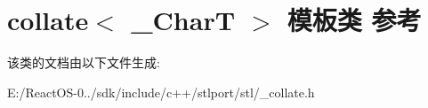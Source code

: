 \hypertarget{classcollate}{}\section{collate$<$ \+\_\+\+CharT $>$ 模板类 参考}
\label{classcollate}


该类的文档由以下文件生成\+:\begin{DoxyCompactItemize}
\item 
E\+:/\+React\+O\+S-\/0../sdk/include/c++/stlport/stl/\+\_\+collate.\+h\end{DoxyCompactItemize}
